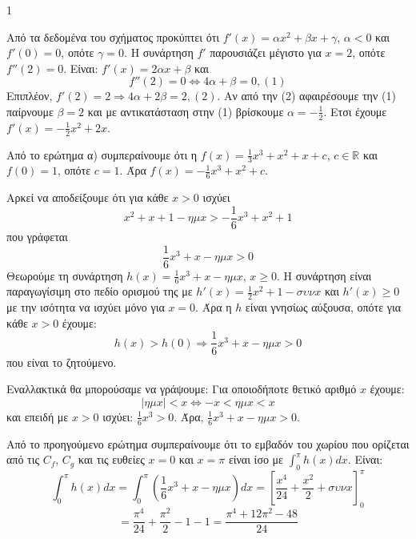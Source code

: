 \begin{ylh}{1}
    \item [ΛΥΣΗ]
\end{ylh}
\begin{alist}
\item
Από τα δεδομένα του σχήματος προκύπτει ότι $f'(x)=\alpha x^2+\beta x+\gamma$, $\alpha<0$ και $f'(0)=0$, οπότε $\gamma=0$. Η συνάρτηση $f'$ παρουσιάζει μέγιστο για $x=2$, οπότε $f''(2)=0$. Είναι: $f'(x)=2\alpha x+\beta$ και
\[ f''(2)=0 \Leftrightarrow 4\alpha+\beta=0, (1) \]
Επιπλέον, $f'(2)=2 \Rightarrow 4\alpha+2\beta=2, (2)$.
Αν από την (2) αφαιρέσουμε την (1) παίρνουμε $\beta=2$ και με αντικατάσταση στην (1) βρίσκουμε $\alpha=-\frac{1}{2}$.
Ετσι έχουμε $f'(x)=-\frac{1}{2}x^2+2x$. 

\item
Από το ερώτημα α) συμπεραίνουμε ότι η $f(x)=\frac{1}{3}x^3+x^2+x+c$, $c \in \mathbb{R}$ και $f(0)=1$, οπότε $c=1$. Άρα $f(x)=-\frac{1}{6}x^3+x^2+c$. 

\item
\begin{rlist}
\item
Αρκεί να αποδείξουμε ότι για κάθε $x>0$ ισχύει
\[ x^2+x+1-\eta\mu x > -\frac{1}{6}x^3+x^2+1 \]
που γράφεται
\[ \frac{1}{6}x^3+x-\eta\mu x > 0 \]
Θεωρούμε τη συνάρτηση $h(x)=\frac{1}{6}x^3+x-\eta\mu x$, $x \ge 0$.
Η συνάρτηση είναι παραγωγίσιμη στο πεδίο ορισμού της με $h'(x)=\frac{1}{2}x^2+1-\sigma\upsilon\nu x$ και $h'(x) \ge 0$ με την ισότητα να ισχύει μόνο για $x=0$. Άρα η $h$ είναι γνησίως αύξουσα, οπότε για κάθε $x>0$ έχουμε:
\[ h(x)>h(0) \Rightarrow \frac{1}{6}x^3+x-\eta\mu x > 0 \]
που είναι το ζητούμενο.

Εναλλακτικά θα μπορούσαμε να γράψουμε:
Για οποιοδήποτε θετικό αριθμό $x$ έχουμε:
\[ |\eta\mu x| < x \Leftrightarrow -x < \eta\mu x < x \]
και επειδή με $x>0$ ισχύει: $\frac{1}{6}x^3>0$. Άρα, $\frac{1}{6}x^3+x-\eta\mu x > 0$. 

\item
Από το προηγούμενο ερώτημα συμπεραίνουμε ότι το εμβαδόν του χωρίου που ορίζεται από τις $C_f$, $C_g$ και τις ευθείες $x=0$ και $x=\pi$ είναι ίσο με $\int_0^\pi h(x)dx$. Είναι:
\[ \int_0^\pi h(x)dx=\int_0^\pi \left(\frac{1}{6}x^3+x-\eta\mu x\right)dx=\left[\frac{x^4}{24}+\frac{x^2}{2}+\sigma\upsilon\nu x\right]_0^\pi \]
\[ =\frac{\pi^4}{24}+\frac{\pi^2}{2}-1-1=\frac{\pi^4+12\pi^2-48}{24} \] 
\end{rlist}
\end{alist}
